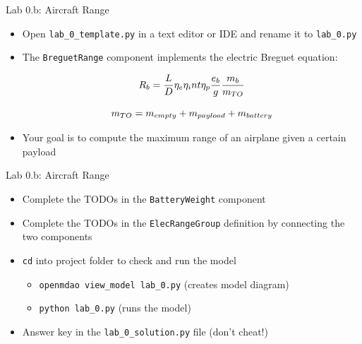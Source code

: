 \documentclass[aspectratio=169, usenames,dvipsnames, 14pt]{beamer}
\begin{document}

\begin{frame}{Lab 0.b: Aircraft Range}
    \begin{itemize}
        \item Open \texttt{lab\_0\_template.py} in a text editor or IDE and rename it to \texttt{lab\_0.py}
        
        \item The \texttt{BreguetRange} component implements the electric Breguet equation: 
        
          $$ \small R_b= \dfrac{L}{D}\eta_e \eta_int \eta_p \dfrac{e_b}{g} \dfrac{m_b}{m_{TO}} $$ 
        
          $$ \small m_{TO} = m_{empty} + m_{payload} + m_{battery} $$
        
        \item Your goal is to compute the maximum range of an airplane given a certain payload
    \end{itemize}
\end{frame}


\begin{frame}{Lab 0.b: Aircraft Range}
    \begin{itemize}
        \item Complete the TODOs in the \texttt{BatteryWeight} component
        \vspace{0.3cm}
        \item Complete the TODOs in the \texttt{ElecRangeGroup} definition by connecting the two components
        \vspace{0.3cm}
        \item \texttt{cd} into project folder to check and run the model
            \begin{itemize}
                \item \texttt{openmdao view\_model lab\_0.py}  (creates model diagram)
                \item \texttt{python lab\_0.py}               (runs the model)
            \end{itemize}
            \vspace{0.3cm}
        \item Answer key in the \texttt{lab\_0\_solution.py} file (don’t cheat!)
    \end{itemize}
\end{frame}
\end{document}
